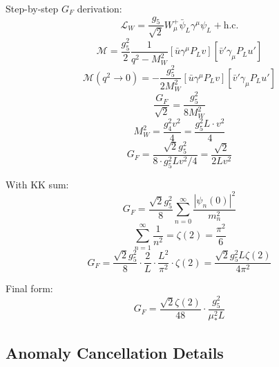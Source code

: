\documentclass[11pt,a4paper]{article}
\begin{document}
Step-by-step $G_F$ derivation:
\begin{equation}
\label{eq:ext-gf-1}
\mathcal{L}_W = \frac{g_5}{\sqrt{2}} W_\mu^+ \bar{\psi}_L \gamma^\mu \psi_L + \text{h.c.}
\end{equation}
\begin{equation}
\label{eq:ext-gf-2}
\mathcal{M} = \frac{g_5^2}{2} \frac{1}{q^2 - M_W^2} [\bar{u}\gamma^\mu P_L v][\bar{v}'\gamma_\mu P_L u']
\end{equation}
\begin{equation}
\label{eq:ext-gf-3}
\mathcal{M}(q^2 \to 0) = -\frac{g_5^2}{2M_W^2} [\bar{u}\gamma^\mu P_L v][\bar{v}'\gamma_\mu P_L u']
\end{equation}
\begin{equation}
\label{eq:ext-gf-4}
\frac{G_F}{\sqrt{2}} = \frac{g_5^2}{8M_W^2}
\end{equation}
\begin{equation}
\label{eq:ext-gf-5}
M_W^2 = \frac{g_4^2 v^2}{4} = \frac{g_5^2 L \cdot v^2}{4}
\end{equation}
\begin{equation}
\label{eq:ext-gf-6}
G_F = \frac{\sqrt{2} g_5^2}{8 \cdot g_5^2 L v^2 / 4} = \frac{\sqrt{2}}{2 L v^2}
\end{equation}

With KK sum:
\begin{equation}
\label{eq:ext-gf-7}
G_F = \frac{\sqrt{2} g_5^2}{8} \sum_{n=0}^{\infty} \frac{|\psi_n(0)|^2}{m_n^2}
\end{equation}
\begin{equation}
\label{eq:ext-gf-8}
\sum_{n=1}^{\infty} \frac{1}{n^2} = \zeta(2) = \frac{\pi^2}{6}
\end{equation}
\begin{equation}
\label{eq:ext-gf-9}
G_F = \frac{\sqrt{2} g_5^2}{8} \cdot \frac{2}{L} \cdot \frac{L^2}{\pi^2} \cdot \zeta(2) = \frac{\sqrt{2} g_5^2 L \zeta(2)}{4\pi^2}
\end{equation}

Final form:
\begin{equation}
\label{eq:ext-gf-10}
G_F = \frac{\sqrt{2} \zeta(2)}{48} \cdot \frac{g_5^2}{\mu_*^2 L}
\end{equation}

\subsection*{Anomaly Cancellation Details}
\label{subsec:anomaly-details}
\end{document}
